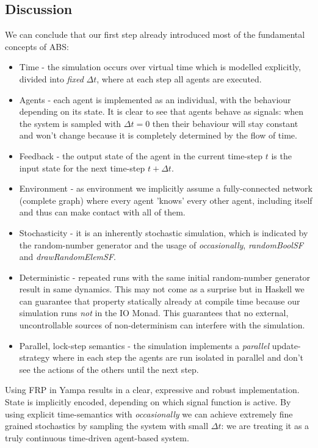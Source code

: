 \subsection{Discussion}
We can conclude that our first step already introduced most of the fundamental concepts of ABS:
\begin{itemize}
	\item Time - the simulation occurs over virtual time which is modelled explicitly, divided into \textit{fixed} $\Delta t$, where at each step all agents are executed.
	\item Agents - each agent is implemented as an individual, with the behaviour depending on its state. It is clear to see that agents behave as signals: when the system is sampled with $\Delta t = 0$ then their behaviour will stay constant and won't change because it is completely determined by the flow of time. 
	\item Feedback - the output state of the agent in the current time-step $t$ is the input state for the next time-step $t + \Delta t$.
	\item Environment - as environment we implicitly assume a fully-connected network (complete graph) where every agent 'knows' every other agent, including itself and thus can make contact with all of them.
	\item Stochasticity - it is an inherently stochastic simulation, which is indicated by the random-number generator and the usage of \textit{occasionally}, \textit{randomBoolSF} and \textit{drawRandomElemSF}.
	\item Deterministic - repeated runs with the same initial random-number generator result in same dynamics. This may not come as a surprise but in Haskell we can guarantee that property statically already at compile time because our simulation runs \textit{not} in the IO Monad. This guarantees that no external, uncontrollable sources of non-determinism can interfere with the simulation.
	\item Parallel, lock-step semantics - the simulation implements a \textit{parallel} update-strategy where in each step the agents are run isolated in parallel and don't see the actions of the others until the next step.
\end{itemize}

Using FRP in Yampa results in a clear, expressive and robust implementation. State is implicitly encoded, depending on which signal function is active. By using explicit time-semantics with \textit{occasionally} we can achieve extremely fine grained stochastics by sampling the system with small $\Delta t$: we are treating it as a truly continuous time-driven agent-based system.

